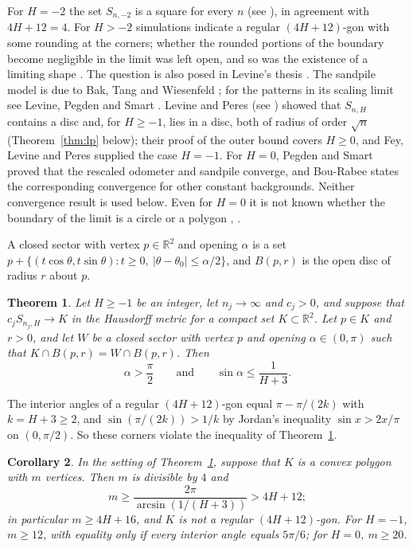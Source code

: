 \documentclass[11pt]{amsart}
\newtheorem{theorem}{Theorem}[section]
\newtheorem{corollary}[theorem]{Corollary}
\theoremstyle{remark}
\numberwithin{equation}{section}
\newcommand{\R}{\mathbb R}
\begin{document}
For $H=-2$ the set $S_{n,-2}$ is a square for every $n$ \cite{FR} (see \cite[Theorem~6.1]{HLMPPW}), in agreement with $4H+12=4$. For $H>-2$ simulations indicate a regular $(4H+12)$-gon with some rounding at the corners; whether the rounded portions of the boundary become negligible in the limit was left open, and so was the existence of a limiting shape \cite[Section~6]{HLMPPW}. The question is also posed in Levine's thesis \cite{Lev07}. The sandpile model is due to Bak, Tang and Wiesenfeld \cite{BTW87}; for the patterns in its scaling limit see Levine, Pegden and Smart \cite{LPS16}. Levine and Peres \cite[Theorem~4.1]{LP} (see \cite[Theorem~6.3]{HLMPPW}) showed that $S_{n,H}$ contains a disc and, for $H\ge-1$, lies in a disc, both of radius of order $\sqrt n$ (Theorem~\ref{thm:lp} below); their proof of the outer bound covers $H\ge0$, and Fey, Levine and Peres \cite[Section~3.1]{FLP} supplied the case $H=-1$. For $H=0$, Pegden and Smart \cite{PS} proved that the rescaled odometer and sandpile converge, and Bou-Rabee \cite[Theorem~9.2]{BR} states the corresponding convergence for other constant backgrounds. Neither convergence result is used below. Even for $H=0$ it is not known whether the boundary of the limit is a circle or a polygon \cite[Section~1]{LP}, \cite[Section~1]{PS}.

A closed sector with vertex $p\in\R^2$ and opening $\alpha$ is a set $p+\{(t\cos\theta,t\sin\theta):t\ge0,\ |\theta-\theta_0|\le\alpha/2\}$, and $B(p,r)$ is the open disc of radius $r$ about $p$.

\begin{theorem}\label{thm:main}
Let $H\ge-1$ be an integer, let $n_j\to\infty$ and $c_j>0$, and suppose that $c_jS_{n_j,H}\to K$ in the Hausdorff metric for a compact set $K\subset\R^2$. Let $p\in K$ and $r>0$, and let $W$ be a closed sector with vertex $p$ and opening $\alpha\in(0,\pi)$ such that $K\cap B(p,r)=W\cap B(p,r)$. Then
\[
\alpha>\frac\pi2\qquad\text{and}\qquad\sin\alpha\le\frac1{H+3}.
\]
\end{theorem}

The interior angles of a regular $(4H+12)$-gon equal $\pi-\pi/(2k)$ with $k=H+3\ge2$, and $\sin(\pi/(2k))>1/k$ by Jordan's inequality $\sin x>2x/\pi$ on $(0,\pi/2)$. So these corners violate the inequality of Theorem~\ref{thm:main}.

\begin{corollary}\label{cor:polygon}
In the setting of Theorem~\ref{thm:main}, suppose that $K$ is a convex polygon with $m$ vertices. Then $m$ is divisible by $4$ and
\[
m\ge\frac{2\pi}{\arcsin(1/(H+3))}>4H+12;
\]
in particular $m\ge4H+16$, and $K$ is not a regular $(4H+12)$-gon. For $H=-1$, $m\ge12$, with equality only if every interior angle equals $5\pi/6$; for $H=0$, $m\ge20$.
\end{corollary}
\end{document}
